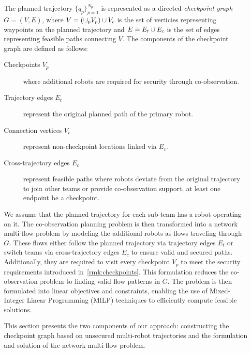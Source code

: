 \documentclass[10pt,twocolumn,twoside]{IEEEtran}
\newcommand{\news}{\color{blue}}
\begin{document}
{\news 
\begin{definition}
  The planned trajectory $\{q_p\}_{p=1}^{N_p}$ is represented as a directed \emph{checkpoint graph} $G=(V, E)$, where $V = (\cup_p V_p) \cup V_c$ is the set of verticies representing waypoints on the planned trajectory and $E = E_{t} \cup E_{c}$ is the set of edges representing feasible paths connecting $V$. The components of the checkpoint graph are defined as follows:
  \begin{description}
    \item[Checkpoints $V_p$] where additional robots are required for security through co-observation.
    \item[Trajectory edges $E_t$] represent the original planned path of the primary robot.
    \item[Connection vertices $V_c$] represent non-checkpoint locations linked via $E_c$.
    \item[Cross-trajectory edges $E_c$] represent feasible paths where robots deviate from the original trajectory to join other teams or provide co-observation support, at least one endpoint be a checkpoint. 
  \end{description}
\end{definition}

We assume that the planned trajectory for each sub-team has a robot operating on it. The co-observation planning problem is then transformed into a network multi-flow problem by modeling the additional robots as flows traveling through $G$. These flows either follow the planned trajectory via trajectory edges $E_t$ or switch teams via cross-trajectory edges $E_c$ to ensure valid and secured paths. Additionally, they are required to visit every checkpoint $V_p$ to meet the security requirements introduced in~\ref{rmk:checkpoints}. This formulation reduces the co-observation problem to finding valid flow patterns in $G$. The problem is then formulated into linear objectives and constraints, enabling the use of Mixed-Integer Linear Programming (MILP) techniques to efficiently compute feasible solutions. }


This section presents the two components of our approach: constructing the checkpoint graph based on unsecured multi-robot trajectories and the formulation and solution of the network multi-flow problem.
\end{document}
